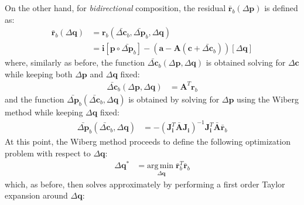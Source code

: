 On the other hand, for \emph{bidirectional} composition, the residual $\bar{\mathbf{r}}_b (\Delta \mathbf{p})$ is defined as:
\begin{equation}
    \begin{aligned}
        \bar{\mathbf{r}}_b(\Delta\mathbf{q}) & = \mathbf{r}_b(\bar{\Delta \mathbf{c}}_b, \bar{\Delta \mathbf{p}}_b, \Delta\mathbf{q})
        \\
        & = \mathbf{i}[\mathbf{p} \circ \bar{\Delta \mathbf{p}}_b] - (\mathbf{a} - \mathbf{A}(\mathbf{c} + \bar{\Delta \mathbf{c}}_b))[\Delta \mathbf{q}]
    \label{eq:bidirectional_wiberg_residual}
    \end{aligned}
\end{equation}
where, similarly as before, the function $\bar{\Delta \mathbf{c}}_b(\Delta \mathbf{p}, \Delta \mathbf{q})$ is obtained solving for $\Delta \mathbf{c}$ while keeping both $\Delta \mathbf{p}$ and $\Delta \mathbf{q}$ fixed:
\begin{equation}
    \begin{aligned}
        \bar{\Delta \mathbf{c}}_b(\Delta \mathbf{p}, \Delta \mathbf{q}) & = \mathbf{A}^T \mathbf{r}_b
        \label{eq:asymmetric_wiberg_c_function}
    \end{aligned}
\end{equation}
and the function $\bar{\Delta \mathbf{p}}_b(\bar{\Delta \mathbf{c}}_b, \Delta\mathbf{q})$ is obtained by solving for $\Delta\mathbf{p}$ using the Wiberg method while keeping $\Delta \mathbf{q}$ fixed:
\begin{equation}
    \begin{aligned}
        \bar{\Delta \mathbf{p}}_b(\bar{\Delta \mathbf{c}}_b, \Delta\mathbf{q}) & = -\left( \mathbf{J}_{\mathbf{i}}^T \bar{\mathbf{A}} \mathbf{J}_{\mathbf{i}} \right)^{-1} \mathbf{J}_{\mathbf{i}}^T \bar{\mathbf{A}} \bar{\mathbf{r}}_b
        \label{eq:asymmetric_wiberg_p_function}
    \end{aligned}
\end{equation}
At this point, the Wiberg method proceeds to define the following optimization problem with respect to $\Delta\mathbf{q}$:
\begin{equation}
    \begin{aligned}
        \Delta\mathbf{q}^* & = \underset{\Delta\mathbf{q}}{\mathrm{arg\,min\;}} \bar{\mathbf{r}}_b^T\bar{\mathbf{r}}_b
    \label{eq:bidirectional_wiberg_problem1}
    \end{aligned}
\end{equation}
which, as before, then solves approximately by performing a first order Taylor expansion around $\Delta\mathbf{q}$:
